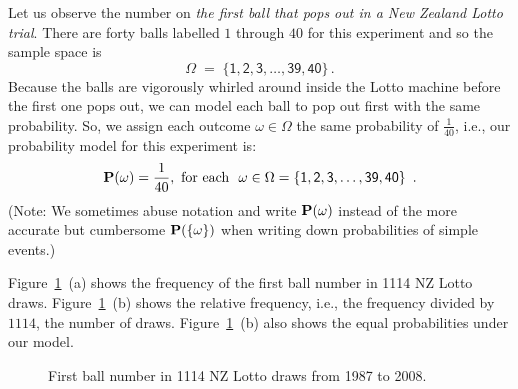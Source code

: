 \begin{example}\label{Eg:NZLottoModel}
Let us observe the number on {\em the first ball that pops out in a New Zealand Lotto trial}.  There are forty balls labelled $1$ through $40$ for this experiment and so the sample space is \[\Omega\;=\;\{\mathsf{1,2,3,\dots,39,40}\}\,.\]  Because the balls are vigorously whirled around inside the Lotto machine before the first one pops out, we can model each ball to pop out first with the same probability.  So, we assign each outcome $\omega \in \Omega$ the same probability of $\frac{1}{40}$, i.e., our probability model for this experiment is:
\[
\mathbf{P}(\omega) = \frac{1}{40}, \ \text{for each \ } \omega \in \Omega = \{\mathsf{1,2,3,\ldots,39,40}\} \enspace .
\]
(Note: We sometimes abuse notation and write $\mathbf{P}(\omega)$ instead of the
more accurate but cumbersome $\mathbf{P}(\{\omega\})$ when writing down
probabilities of simple events.)

Figure~\ref{F:LottoDraws}~(a) shows the frequency of the first ball number in 1114 NZ Lotto draws.  
Figure~\ref{F:LottoDraws}~(b) shows the relative frequency, i.e., the frequency divided by $1114$, the number of draws.  
Figure~\ref{F:LottoDraws}~(b) also shows the equal probabilities under our model.

\begin{figure}[htbp]
\centering
{}
\quad
{}
\caption{First ball number in 1114 NZ Lotto draws from 1987 to 2008.\label{F:LottoDraws}}
\end{figure}
\end{example}


